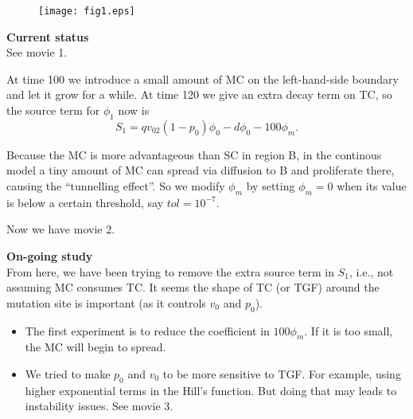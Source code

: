 \documentclass[12pt]{article}
\begin{document}
\begin{figure}
\texttt{[image: fig1.eps]}
\end{figure}

\noindent\textbf{Current status}\\
See movie 1.

At time 100 we introduce a small amount of MC on the left-hand-side
boundary and let it grow for a while. At time 120 we give
an extra decay term on TC, so the source term for $\phi_1$ now is
$$
S_1 = qv_02(1-p_0)\phi_0 - d\phi_0 - 100\phi_m.
$$

Because the MC is more advantageous than SC in region B, in 
the continous model a tiny amount of MC can spread via diffusion
to B and proliferate there, causing the ``tunnelling effect''.
So we modify $\phi_m$ by setting $\phi_m = 0$ when its value
is below a certain threshold, say $tol = 10^{-7}$.

Now we have movie 2.

\noindent\textbf{On-going study}\\
From here, we have been trying to remove the extra source term
in $S_1$, i.e., not assuming MC consumes TC. It seems the shape
of TC (or TGF) around the mutation site is important 
(as it controls $v_0$ and $p_0$).

\begin{itemize}
\item
The first experiment is to reduce the coefficient
in $100\phi_m$. If it is too small, the MC will begin
to spread. 

\item
We tried to make $p_0$ and $v_0$ to be more sensitive 
to TGF. For example, using higher exponential terms in
the Hill's function. But doing that may leads to instability issues.
See movie 3.
\end{itemize} 
\end{document}
